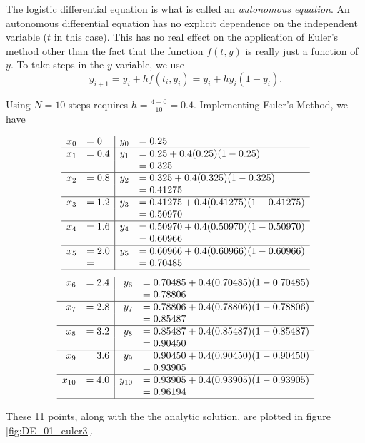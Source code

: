{The logistic differential equation is what is called an \emph{autonomous equation}.  An autonomous differential equation  has no explicit dependence on the independent variable ($t$ in this case).  This has no real effect on the application of Euler's method other than the fact that the function $f(t,y)$ is really just a function of $y$.  To take steps in the $y$ variable, we use
\[y_{i+1} = y_i + hf(t_i,y_i) = y_i + hy_i(1-y_i).\]

Using $N=10$ steps requires $\displaystyle h = \frac{4-0}{10} = 0.4.$  Implementing Euler's Method, we have

\[
\begin{array}{rl | rl}
x_0  &= 0			& 	y_0	&= 0.25\\ \hline
x_1 	&= 0.4		&	y_1 	&= 0.25 + 0.4(0.25)(1-0.25)\\
	&			&		&= 0.325\\ \hline
x_2 	&= 0.8 		& 	y_2 	&= 0.325 + 0.4(0.325)(1-0.325)\\
	&			&		&= 0.41275\\ \hline
x_3	&= 1.2		&	y_3 	&= 0.41275 + 0.4(0.41275)(1-0.41275)\\
	&			&		&= 0.50970\\ \hline
x_4	&= 1.6		&	y_4	&= 0.50970 + 0.4(0.50970)(1 - 0.50970)\\
	&			&		&= 0.60966\\ \hline
x_5  &= 2.0		& 	y_5	&= 0.60966 + 0.4(0.60966)(1-0.60966)\\
	&=			&		&=  0.70485\\ \hline
\end{array}
\]
\[
\begin{array}{rl | rl}
x_6 	&= 2.4		&	y_6 	&= 0.70485 + 0.4(0.70485)(1 - 0.70485)\\
	&			&		&= 0.78806\\ \hline
x_7 	&= 2.8 		& 	y_7 	&= 0.78806 + 0.4(0.78806)(1-0.78806)\\
	&			&		&= 0.85487\\ \hline
x_8	&= 3.2		&	y_8 	&= 0.85487 + 0.4(0.85487)(1-0.85487)\\
	&			&		&= 0.90450\\ \hline
x_9	&= 3.6		&	y_9	&= 0.90450 + 0.4(0.90450)(1 - 0.90450)\\
	&			&		&= 0.93905\\ \hline
x_{10}&= 4.0		&	y_{10}&= 0.93905 + 0.4(0.93905)(1 - 0.93905)\\
	&			&		&= 0.96194\\ \hline
\end{array}
\]

These 11 points, along with the  the analytic solution, are plotted in figure \ref{fig:DE_01_euler3}.
}\\


